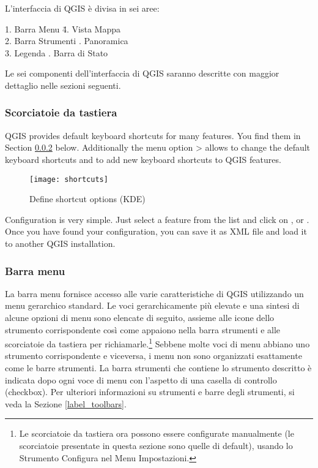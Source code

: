 L'interfaccia di QGIS è divisa in sei aree:

\begin{tabbing}
1. Barra Menu \hspace{3cm}\= 4. Vista Mappa \\
2. Barra Strumenti \hspace{3cm}. Panoramica  \\
3. Legenda \hspace{3cm}. Barra di Stato   
\end{tabbing}

Le sei componenti dell'interfaccia di QGIS saranno descritte con maggior dettaglio
nelle sezioni seguenti.

\subsubsection{Scorciatoie da tastiera}\label{shortcuts}

QGIS provides default keyboard shortcuts for many features. You find them in
Section \ref{label_menubar} below. Additionally the menu option  >
 allows to change the default keyboard
shortcuts and to add new keyboard shortcuts to QGIS features.  

\begin{figure}[ht]
   \begin{center}
   \caption{Define shortcut options \nixcaption (KDE)}
         \label{fig:shortcuts}
   \texttt{[image: shortcuts]}
\end{center}
\end{figure}

Configuration is very simple. Just select a feature from the list and click
on ,  or . Once you have
found your configuration, you can save it as XML file and load it to another
QGIS installation. 

\subsubsection{Barra menu}\label{label_menubar}

La barra menu fornisce accesso alle varie caratteristiche di QGIS utilizzando un menu
gerarchico standard. Le voci gerarchicamente più elevate e una sintesi di alcune opzioni
di menu sono elencate di seguito, assieme alle icone dello strumento corrispondente
così come appaiono nella barra strumenti e alle scorciatoie da tastiera per richiamarle.\footnote{Le scorciatoie da tastiera ora possono
essere configurate manualmente (le scorciatoie presentate in questa sezione sono quelle di default), usando lo Strumento Configura 
nel Menu Impostazioni.}
Sebbene molte voci di menu abbiano uno strumento corrispondente e viceversa,
i menu non sono organizzati esattamente come le barre strumenti. 
La barra strumenti che contiene lo strumento descritto è indicata dopo ogni voce di menu
con l'aspetto di una casella di controllo (checkbox).
Per ulteriori informazioni su strumenti e barre degli strumenti, si veda la Sezione \ref{label_toolbars}.

